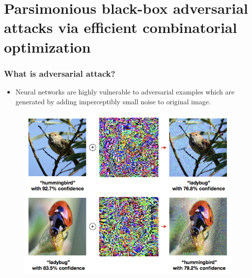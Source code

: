 \documentclass[10pt,mathserif]{beamer}
\begin{document}
\section{Parsimonious black-box adversarial attacks via efficient combinatorial optimization}


\begin{frame}
\frametitle{What is adversarial attack?}
\begin{itemize}\itemsep=12pt
    \item Neural networks are highly vulnerable to adversarial examples which are generated by adding imperceptibly small noise to original image.
\end{itemize}
\begin{figure}
    \centering
    \includegraphics[scale=0.30]{figures/adversarial_attack.png}
    \label{fig:adversarial_attack}
\end{figure}
\vspace{-3em}
\end{frame}
\end{document}
